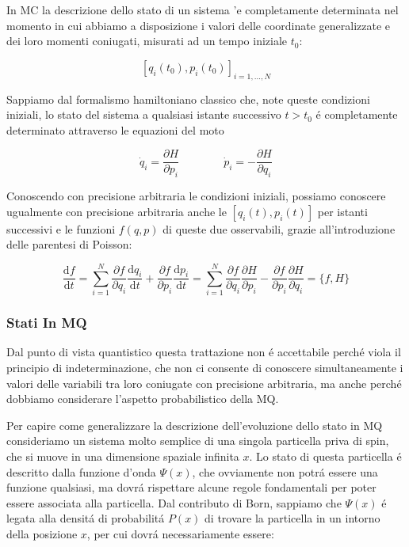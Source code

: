 In MC la descrizione dello stato di un sistema 'e completamente determinata nel momento in cui abbiamo a disposizione i valori delle coordinate generalizzate e dei loro momenti coniugati, misurati ad un tempo iniziale $t_0$:

$$[q_i(t_0), p_i(t_0)]_{i=1, \ldots, N}$$

Sappiamo dal formalismo hamiltoniano classico che, note queste condizioni iniziali, lo stato del sistema a qualsiasi istante successivo $t > t_0$ \'e completamente determinato attraverso le equazioni del moto

\begin{equation}
	{\dot{q}}_{i}={\frac{\partial H}{\partial p_{i}}}\qquad\qquad{\dot{p}}_{i}=-{\frac{\partial H}{\partial q_{i}}}
\end{equation}

Conoscendo con precisione arbitraria le condizioni iniziali, possiamo conoscere ugualmente con precisione arbitraria anche le $[q_i(t), p_i(t)]$ per istanti successivi e le funzioni $f(q, p)$ di queste due osservabili, grazie all'introduzione delle parentesi di Poisson:

$${\frac{\mathrm{d}f}{\mathrm{d}t}}=\sum_{i=1}^{N}{\frac{\partial f}{\partial q_{i}}}{\frac{\mathrm{d}q_{i}}{\mathrm{d}t}}+{\frac{\partial f}{\partial p_{i}}}{\frac{\mathrm{d}p_{i}}{\mathrm{d}t}}=\sum_{i=1}^{N}{\frac{\partial f}{\partial q_{i}}}{\frac{\partial H}{\partial p_{i}}}-{\frac{\partial f}{\partial p_{i}}}{\frac{\partial H}{\partial q_{i}}}=\{f,H\}$$


\subsubsection{Stati In MQ}

Dal punto di vista quantistico questa trattazione non \'e accettabile perch\'e viola il principio di indeterminazione, che non ci consente di conoscere simultaneamente i valori delle variabili tra loro coniugate con precisione arbitraria, ma anche perch\'e dobbiamo considerare l'aspetto probabilistico della MQ.

Per capire come generalizzare la descrizione dell'evoluzione dello stato in MQ consideriamo un sistema molto semplice di una singola particella priva di spin, che si muove in una dimensione spaziale infinita $x$. Lo stato di questa particella \'e descritto dalla funzione d'onda $\Psi(x)$, che ovviamente non potr\'a essere una funzione qualsiasi, ma dovr\'a rispettare alcune regole fondamentali per poter essere associata alla particella. Dal contributo di Born, sappiamo che $\Psi(x)$ \'e legata alla densit\'a di probabilit\'a $P(x)$ di trovare la particella in un intorno della posizione $x$, per cui dovr\'a necessariamente essere:

